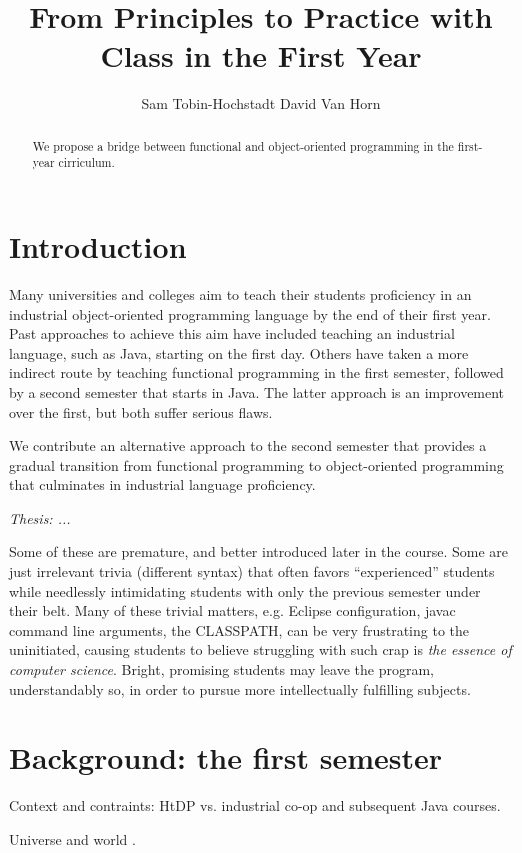 \documentclass[submission,copyright]{eptcs}
\title{From Principles to Practice with Class in the First Year}
\author{Sam Tobin-Hochstadt \quad\qquad David Van Horn
\institute{Northeastern University\\
Boston, Massachusetts, USA}
\email{\{samth,dvanhorn\}@ccs.neu.edu}
}
\begin{document}
\maketitle

\begin{abstract}
We propose a bridge between functional and object-oriented programming
in the first-year cirriculum.
\end{abstract}

\section{Introduction}

Many universities and colleges aim to teach their students proficiency
in an industrial object-oriented programming language by the end of
their first year.  Past approaches to achieve this aim have included
teaching an industrial language, such as Java, starting on the first
day.  Others have taken a more indirect route by teaching functional
programming in the first semester, followed by a second semester that
starts in Java.  The latter approach is an improvement over the first,
but both suffer serious flaws.

We contribute an alternative approach to the second semester that
provides a gradual transition from functional programming to
object-oriented programming that culminates in industrial language
proficiency.

\emph{Thesis: ...}


Some of these are premature, and better introduced later in the
course.  Some are just irrelevant trivia (different syntax) that often
favors ``experienced'' students while needlessly intimidating students
with only the previous semester under their belt.  Many of these
trivial matters, e.g. Eclipse configuration, javac command line
arguments, the CLASSPATH, can be very frustrating to the uninitiated,
causing students to believe struggling with such crap is \emph{the
  essence of computer science}.  Bright, promising students may leave
the program, understandably so, in order to pursue more intellectually
fulfilling subjects.


\section{Background: the first semester}

Context and contraints: HtDP vs. industrial co-op and subsequent Java courses.

Universe and world \cite{dvanhorn:Felleisen2009Functional}.
\end{document}
